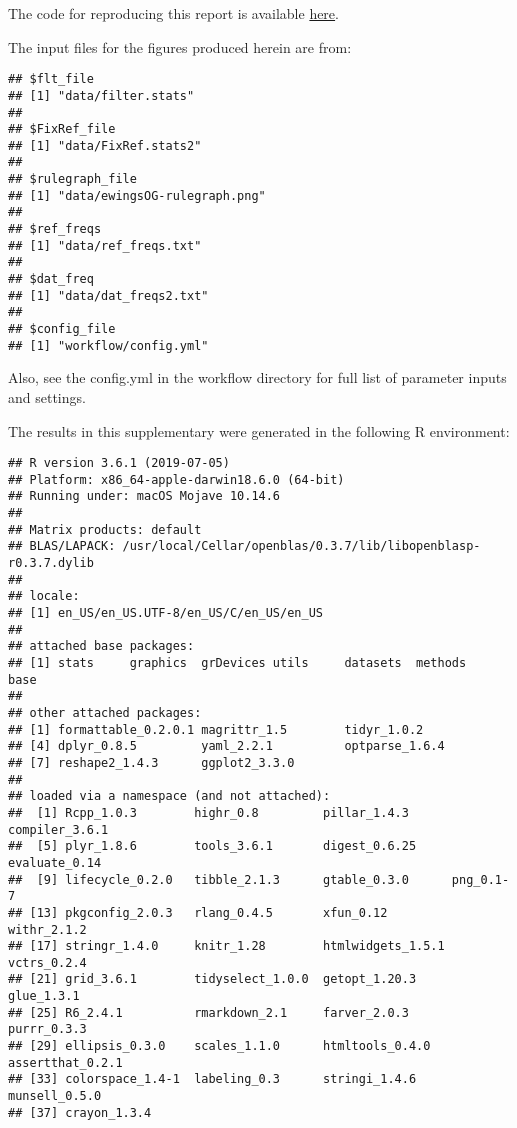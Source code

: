 \documentclass[]{article}
\begin{document}
The code for reproducing this report is available
\href{https://github.com/pmonnahan/DataPrep/blob/master/scripts/DataPrep_report.Rmd}{here}.

The input files for the figures produced herein are from:

\begin{verbatim}
## $flt_file
## [1] "data/filter.stats"
## 
## $FixRef_file
## [1] "data/FixRef.stats2"
## 
## $rulegraph_file
## [1] "data/ewingsOG-rulegraph.png"
## 
## $ref_freqs
## [1] "data/ref_freqs.txt"
## 
## $dat_freq
## [1] "data/dat_freqs2.txt"
## 
## $config_file
## [1] "workflow/config.yml"
\end{verbatim}

Also, see the config.yml in the workflow directory for full list of
parameter inputs and settings.

The results in this supplementary were generated in the following R
environment:

\footnotesize

\begin{verbatim}
## R version 3.6.1 (2019-07-05)
## Platform: x86_64-apple-darwin18.6.0 (64-bit)
## Running under: macOS Mojave 10.14.6
## 
## Matrix products: default
## BLAS/LAPACK: /usr/local/Cellar/openblas/0.3.7/lib/libopenblasp-r0.3.7.dylib
## 
## locale:
## [1] en_US/en_US.UTF-8/en_US/C/en_US/en_US
## 
## attached base packages:
## [1] stats     graphics  grDevices utils     datasets  methods   base     
## 
## other attached packages:
## [1] formattable_0.2.0.1 magrittr_1.5        tidyr_1.0.2        
## [4] dplyr_0.8.5         yaml_2.2.1          optparse_1.6.4     
## [7] reshape2_1.4.3      ggplot2_3.3.0      
## 
## loaded via a namespace (and not attached):
##  [1] Rcpp_1.0.3        highr_0.8         pillar_1.4.3      compiler_3.6.1   
##  [5] plyr_1.8.6        tools_3.6.1       digest_0.6.25     evaluate_0.14    
##  [9] lifecycle_0.2.0   tibble_2.1.3      gtable_0.3.0      png_0.1-7        
## [13] pkgconfig_2.0.3   rlang_0.4.5       xfun_0.12         withr_2.1.2      
## [17] stringr_1.4.0     knitr_1.28        htmlwidgets_1.5.1 vctrs_0.2.4      
## [21] grid_3.6.1        tidyselect_1.0.0  getopt_1.20.3     glue_1.3.1       
## [25] R6_2.4.1          rmarkdown_2.1     farver_2.0.3      purrr_0.3.3      
## [29] ellipsis_0.3.0    scales_1.1.0      htmltools_0.4.0   assertthat_0.2.1 
## [33] colorspace_1.4-1  labeling_0.3      stringi_1.4.6     munsell_0.5.0    
## [37] crayon_1.3.4
\end{verbatim}

\normalsize
\end{document}
